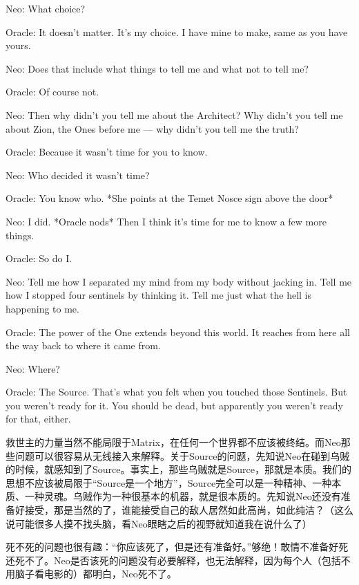 \documentclass[UTF8]{ctexart}
\newenvironment{myquote}{\color{green} \setlength{\leftskip}{6em} \setlength{\rightskip}{4em} \setlength{\parindent}{-2em}}{\par}
\begin{document}
\begin{myquote}
Neo: What choice?

Oracle: It doesn't matter. It's my choice. I have mine to make, same as you have yours.

Neo: Does that include what things to tell me and what not to tell me?

Oracle: Of course not.

Neo: Then why didn't you tell me about the Architect? Why didn't you tell me about Zion, the Ones before me --- why didn't you tell me the truth?

Oracle: Because it wasn't time for you to know.

Neo: Who decided it wasn't time?

Oracle: You know who. *She points at the Temet Nosce sign above the door*

Neo: I did. *Oracle nods* Then I think it's time for me to know a few more things.

Oracle: So do I.

Neo: Tell me how I separated my mind from my body without jacking in. Tell me how I stopped four sentinels by thinking it. Tell me just what the hell is happening to me.

Oracle: The power of the One extends beyond this world. It reaches from here all the way back to where it came from.

Neo: Where?

Oracle: The Source. That's what you felt when you touched those Sentinels. But you weren't ready for it. You should be dead, but apparently you weren't ready for that, either.
\end{myquote}

救世主的力量当然不能局限于Matrix，在任何一个世界都不应该被终结。而Neo那些问题可以很容易从无线接入来解释。关于Source的问题，先知说Neo在碰到乌贼的时候，就感知到了Source。事实上，那些乌贼就是Source，那就是本质。我们的思想不应该被局限于“Source是一个地方”，Source完全可以是一种精神、一种本质、一种灵魂。乌贼作为一种很基本的机器，就是很本质的。先知说Neo还没有准备好接受，那是当然的了，谁能接受自己的敌人居然如此高尚，如此纯洁？（这么说可能很多人摸不找头脑，看Neo眼瞎之后的视野就知道我在说什么了）

死不死的问题也很有趣：“你应该死了，但是还有准备好。”够绝！敢情不准备好死还死不了。Neo是否该死的问题没有必要解释，也无法解释，因为每个人（包括不用脑子看电影的）都明白，Neo死不了。
\end{document}
